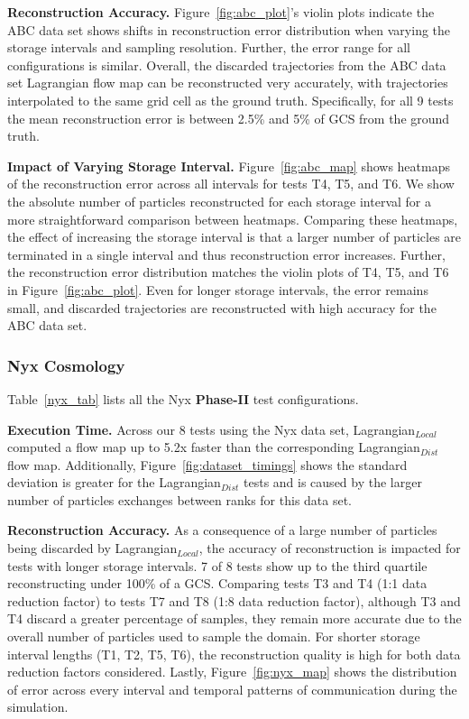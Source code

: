\textbf{Reconstruction Accuracy.} Figure~\ref{fig:abc_plot}'s violin plots indicate the ABC data set shows shifts in reconstruction error distribution when varying the storage intervals and sampling resolution. 
%
Further, the error range for all configurations is similar.
%
Overall, the discarded trajectories from the ABC data set Lagrangian flow map can be reconstructed very accurately, with trajectories interpolated to the same grid cell as the ground truth.
%
Specifically, for all 9 tests the mean reconstruction error is between 2.5\% and 5\% of GCS from the ground truth.
%

\textbf{Impact of Varying Storage Interval.} Figure~\ref{fig:abc_map} shows heatmaps of the reconstruction error across all intervals for tests T4, T5, and T6.
%
We show the absolute number of particles reconstructed for each storage interval for a more straightforward comparison between heatmaps.
%
Comparing these heatmaps, the effect of increasing the storage interval is that a larger number of particles are terminated in a single interval and thus reconstruction error increases. 
%
Further, the reconstruction error distribution matches the violin plots of T4, T5, and T6 in Figure~\ref{fig:abc_plot}. 
%
Even for longer storage intervals, the error remains small, and discarded trajectories are reconstructed with high accuracy for the ABC data set.

\subsubsection{Nyx Cosmology}
\label{sec:nyx}
Table~\ref{nyx_tab} lists all the Nyx \textbf{Phase-II} test configurations. 
%


\textbf{Execution Time.} Across our 8 tests using the Nyx data set, Lagrangian$_{Local}$ computed a flow map up to 5.2x faster than the corresponding Lagrangian$_{Dist}$ flow map.
%
Additionally, Figure~\ref{fig:dataset_timings} shows the standard deviation is greater for the Lagrangian$_{Dist}$ tests and is caused by the larger number of particles exchanges between ranks for this data set.
%

\textbf{Reconstruction Accuracy.} As a consequence of a large number of particles being discarded by Lagrangian$_{Local}$, the accuracy of reconstruction is impacted for tests with longer storage intervals.
%
7 of 8 tests show up to the third quartile reconstructing under 100\% of a GCS. 
%
Comparing tests T3 and T4 (1:1 data reduction factor) to tests T7 and T8 (1:8 data reduction factor), although T3 and T4 discard a greater percentage of samples, they remain more accurate due to the overall number of particles used to sample the domain.
%
For shorter storage interval lengths (T1, T2, T5, T6), the reconstruction quality is high for both data reduction factors considered. 
%
Lastly, Figure~\ref{fig:nyx_map} shows the distribution of error across every interval and temporal patterns of communication during the simulation. 

